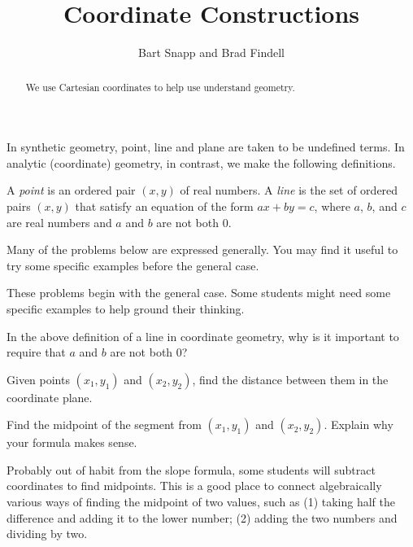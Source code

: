 \documentclass[nooutcomes]{ximera}
\title{Coordinate Constructions}
\author{Bart Snapp and Brad Findell}
\begin{document}
\begin{abstract}
  We use Cartesian coordinates to help use understand geometry.
\end{abstract}
\maketitle

In synthetic geometry, point, line and plane are taken to be undefined terms.  In analytic (coordinate) geometry, in contrast, we make the following definitions.  
\begin{definition}
A \emph{point} is an ordered pair $(x,y)$ of real numbers. A \emph{line} is the set of ordered pairs $(x,y)$ that satisfy an equation of the form $ax + by = c$, where $a$, $b$, and $c$ are real numbers and $a$ and $b$ are not both 0.   
\end{definition}

Many of the problems below are expressed generally.  You may find it useful to try some specific examples before the general case.  

\begin{teachingnote}
These problems begin with the general case.  Some students might need some specific examples to help ground their thinking.
\end{teachingnote}

\begin{problem}
In the above definition of a line in coordinate geometry, why is it important to require that $a$ and $b$ are not both 0?  
\end{problem}

\begin{problem}
Given points $(x_1, y_1)$ and $(x_2, y_2)$, find the distance between them in the coordinate plane.
\end{problem}

\begin{problem}
Find the midpoint of the segment from $(x_1, y_1)$ and $(x_2, y_2)$.  Explain why your formula makes sense. 
\end{problem}

\begin{teachingnote}
Probably out of habit from the slope formula, some students will subtract coordinates to find midpoints.  This is a good place to connect algebraically various ways of finding the midpoint of two values, such as (1) taking half the difference and adding it to the lower number; (2) adding the two numbers and dividing by two. 
\end{teachingnote}   
\end{document}

